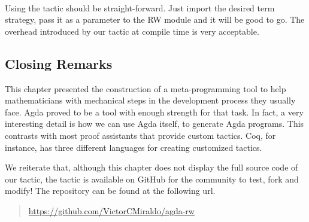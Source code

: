 \\

Using the  tactic should be straight-forward. Just import the desired term strategy, pass it
as a parameter to the RW module and it will be good to go. The overhead introduced by our tactic
at compile time is very acceptable.

\subsection{Closing Remarks}

This chapter presented the construction of a meta-programming tool to help mathematicians
with mechanical steps in the development process they usually face. Agda proved
to be a tool with enough strength for that task. In fact, a very interesting detail is
how we can use Agda itself, to generate Agda programs. This contrasts with most proof assistants
that provide custom tactics. Coq, for instance, has three different languages for creating
customized tactics.

We reiterate that, although this chapter does not display the full source code of our tactic,
the tactic is available on GitHub for the community to test, fork and modify! The repository
can be found at the following url.
\begin{quote}
\small \url{https://github.com/VictorCMiraldo/agda-rw}
\end{quote}

